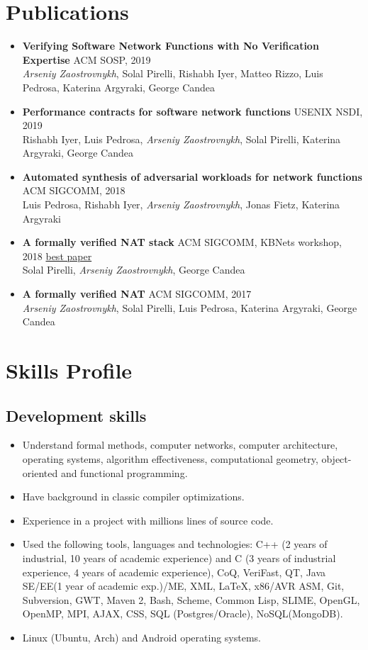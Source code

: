 \documentclass[letterpaper]{resume}
\begin{document}
\section{Publications}

\begin{itemize}
\item \textbf{Verifying Software Network Functions with No Verification Expertise} {ACM SOSP, 2019}\\
  \emph{Arseniy Zaostrovnykh}, Solal Pirelli, Rishabh Iyer, Matteo Rizzo, Luis Pedrosa, Katerina Argyraki, George Candea
\item \textbf{Performance contracts for software network functions} {USENIX NSDI, 2019} \\
  Rishabh Iyer, Luis Pedrosa, \emph{Arseniy Zaostrovnykh}, Solal Pirelli, Katerina Argyraki, George Candea
\item \textbf{Automated synthesis of adversarial workloads for network
    functions} {ACM SIGCOMM, 2018}\\
  Luis Pedrosa, Rishabh Iyer, \emph{Arseniy Zaostrovnykh}, Jonas Fietz, Katerina Argyraki
\item \textbf{A formally verified NAT stack} {ACM SIGCOMM, KBNets workshop, 2018}
  \underline{best paper} \\
  Solal Pirelli, \emph{Arseniy Zaostrovnykh}, George Candea
\item \textbf{A formally verified NAT} {ACM SIGCOMM, 2017}\\
  \emph{Arseniy Zaostrovnykh}, Solal Pirelli, Luis Pedrosa, Katerina Argyraki, George Candea

\end{itemize}

\section{Skills Profile}
\subsection{Development skills}
\begin{itemize}
    \item Understand formal methods, computer networks, computer architecture, operating systems, algorithm effectiveness, computational geometry, object-oriented and functional programming.
    \item Have background in classic compiler optimizations.
    \item Experience in a project with millions lines of source code.
    \item Used the following tools, languages and technologies: C++ (2 years of
      industrial, 10 years of academic experience) and C (3 years of industrial
      experience, 4 years of academic experience), CoQ, VeriFast, QT, Java SE/EE(1 year of academic exp.)/ME, XML, \LaTeX, x86/AVR ASM, Git, Subversion, GWT, Maven 2, Bash, Scheme, Common Lisp, SLIME, OpenGL, OpenMP, MPI, AJAX, CSS, SQL (Postgres/Oracle), NoSQL(MongoDB).
    \item Linux (Ubuntu, Arch) and Android operating systems.
\end{itemize}
\end{document}
